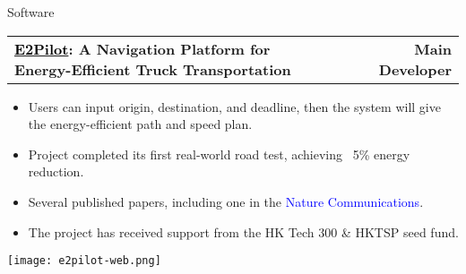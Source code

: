\documentclass{resume} %
\makeatletter
\newcommand{\projectheader}[3]{%
  \begin{tabular*}{\linewidth}{@{}l@{\extracolsep{\fill}}l@{\extracolsep{\fill}}r@{}}
    \textbf{#1} & \textbf{#2} & \textbf{#3} \\
  \end{tabular*}%
  \vspace{0.5em} %
}
\makeatother
\begin{document}
\begin{rSection}{Software}
        \projectheader{\href{https://www.e2pilots.com/}{\textcolor{black}{E2Pilot}}: A Navigation Platform for Energy-Efficient Truck Transportation}{}{Main Developer}
        \begin{minipage}[h]{0.72\textwidth} %
            \begin{itemize}
                \item Users can input origin, destination, and deadline, then the system will give the energy-efficient path and speed plan. %
                \item Project completed its first real-world road test, achieving ~5\% energy reduction.
                \item Several published papers, including one in the \textcolor{blue}{Nature Communications}.
                \item The project has received support from the HK Tech 300 \& HKTSP seed fund.
            \end{itemize}

        \end{minipage}%
        \hfill %
        \begin{minipage}[h]{0.26\textwidth} %
            \centering
            \texttt{[image: e2pilot-web.png]} %
        \end{minipage}


\end{rSection}
\end{document}
